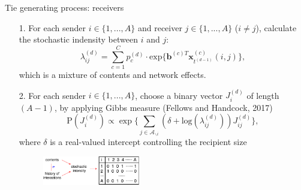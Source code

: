 \documentclass[10pt, xcolor=table]{beamer}
\theoremstyle{definition}
\theoremstyle{remark}
\begin{document}
\begin{frame}{Tie generating process: receivers}
		\begin{itemize}
		\item [1.] For each sender $i \in \{1,...,A\}$ and receiver $j \in \{1,...,A\}$ ($i \neq j$), calculate the stochastic indensity between $i$ and $j$:
			\begin{equation*}\lambda^{(d)}_{ij}=\sum\limits_{c=1}^{C} p^{(d)}_c
		\cdot  \mbox{exp}\Big\{ \boldsymbol{b}^{(c)T}\boldsymbol{x}^{(c)}_{t^{(d-1)}}(i, j)\Big\},	\end{equation*}\normalsize
		which is a mixture of contents and network effects.\\ \vspace{0.4cm}
		\item[2.] For each sender $i \in \{1,...,A\}$, choose a binary vector $J^{(d)}_i$ of length $(A-1)$, by applying Gibbs measure (Fellows and Handcock, 2017) 
		\begin{equation*} \text{P}(J_i^{(d)}) \propto \exp\Big\{ \sum_{j \in \mathcal{A}_{\backslash i}} (\delta+\mbox{log}(\lambda_{ij}^{(d)}))J_{ij}^{(d)} \Big\},
		\end{equation*}
		\normalsize
		where $\delta$ is a real-valued intercept controlling the recipient size\\ \vspace{0.1cm}
 \begin{figure}
 	\includegraphics[width=0.4\textwidth]{figures/edge.pdf}
 \end{figure}	
	\end{itemize}
	\end{frame}
\end{document}
